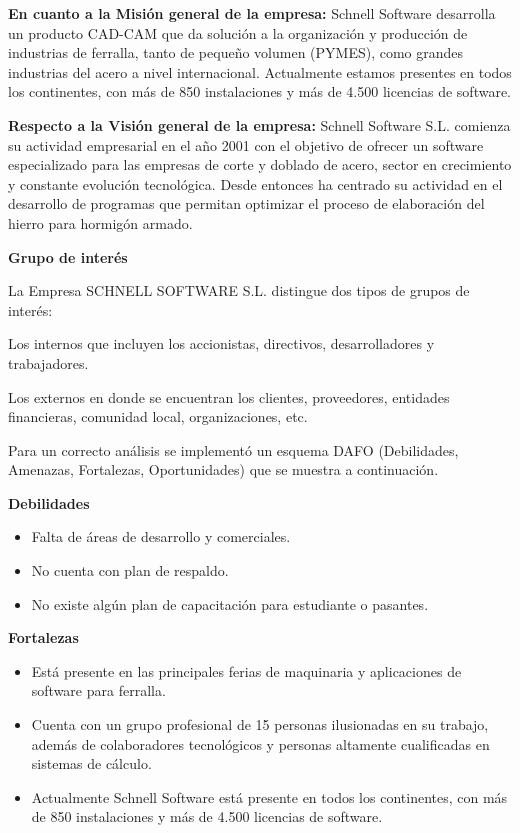 \documentclass[10pt,a4paper]{article}
\begin{document}
\begin{enumerate}
\textbf{En cuanto a la Misión general de la empresa: }Schnell Software desarrolla un producto CAD-CAM que da solución a la organización y producción de industrias de ferralla, tanto de pequeño volumen (PYMES), como grandes industrias del acero a nivel internacional. Actualmente estamos presentes en todos los continentes, con más de 850 instalaciones y más de 4.500 licencias de software.

\textbf{Respecto a la Visión general de la empresa: }Schnell Software S.L. comienza su actividad empresarial en el año 2001 con el objetivo de ofrecer un software especializado para las empresas de corte y doblado de acero, sector en crecimiento y constante evolución tecnológica. Desde entonces ha centrado su actividad en el desarrollo de programas que permitan optimizar el proceso de elaboración del hierro para hormigón armado.

\textbf{Grupo de interés}

La Empresa SCHNELL SOFTWARE S.L. distingue dos tipos de grupos de interés:

Los internos que incluyen los accionistas, directivos, desarrolladores y trabajadores.

Los externos en donde se encuentran los clientes, proveedores, entidades financieras, comunidad local, organizaciones, etc.

Para un correcto análisis se implementó un esquema DAFO (Debilidades, Amenazas, Fortalezas, Oportunidades) que se muestra a continuación.

\textbf{Debilidades}

\begin{itemize}
\item Falta de áreas de desarrollo y comerciales.
\item No cuenta con plan de respaldo.
\item No existe algún plan de capacitación para estudiante o pasantes.
\end{itemize}

\textbf{Fortalezas}

\begin{itemize}
\item Está presente en las principales ferias de maquinaria y aplicaciones de software para ferralla.
\item Cuenta con un grupo profesional de 15 personas ilusionadas en su trabajo, además de colaboradores tecnológicos y personas altamente cualificadas en sistemas de cálculo.
\item Actualmente Schnell Software está presente en todos los continentes, con más de 850 instalaciones y más de 4.500 licencias de software.
\end{itemize}


\end{enumerate}
\end{document}
